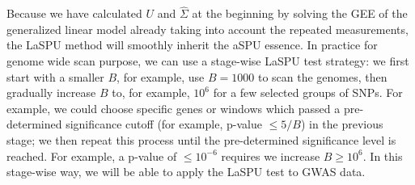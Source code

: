 \documentclass[12pt]{article}
\begin{document}
Because we have calculated $U$ and $\hat{\Sigma}$ at the beginning by solving the GEE of the generalized linear model already taking into account the repeated measurements, the LaSPU method will smoothly inherit the aSPU essence. In practice for genome wide scan purpose, we can use a stage-wise LaSPU test strategy: we first start with a smaller $B$, for example, use $B = 1000$ to scan the genomes, then gradually increase $B$ to, for example, $10^6$ for a few selected groups of SNPs. For example, we could choose specific genes or windows which passed a pre-determined significance cutoff (for example, p-value $ \leq 5/B$) in the previous stage; we then repeat this process until the pre-determined significance level is reached. For example, a p-value of $\leq 10 ^ {-6}$ requires we increase $B \geq 10^6$. In this stage-wise way, we will be able to apply the LaSPU test to GWAS data. 
%
\end{document}
